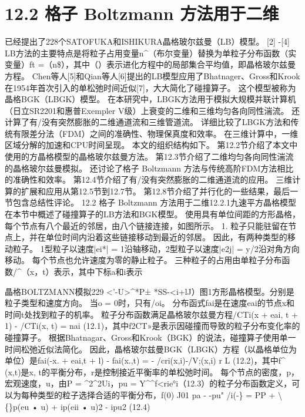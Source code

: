 \documentclass[UTF8,11pt,a4paper,openany,fontset=fandol]{ctexbook}
\begin{document}
\section{12.2 格子 Boltzmann 方法用于二维}
已经提出了228个SATOFUKA和ISHIKURA晶格玻尔兹曼（LB）模型。 [2] -[4] LB方法的主要特点是将粒子占用变量n\textasciicircum{}（布尔变量）替换为单粒子分布函数（实变量）ft =（n\$），其中（）表示进化方程中的局部集合平均值，即晶格玻尔兹曼方程。 Chen等人[5]和Qian等人[6]提出的LB模型应用了Bhatnager、Gross和Krook在1954年首次引入的单松弛时间近似[7]，大大简化了碰撞算子。 这个模型被称为晶格BGK（LBGK）模型。 在本研究中，LBGK方法用于模拟大规模并联计算机（日立SR2201和惠普Exempler V级）上衰变的二维和三维均匀各向同性湍流。 还计算了有/没有突然膨胀的二维通道流和三维管道流。 详细比较了LBGK方法和传统有限差分法（FDM）之间的准确性、物理保真度和效率。 在三维计算中，一维区域分解的加速和CPU时间呈现。 本文的组织结构如下。 第12.2节介绍了本文中使用的方晶格模型的晶格玻尔兹曼方法。 第12.3节介绍了二维均匀各向同性湍流的晶格玻尔兹曼模拟。 还讨论了格子 Boltzmann 方法与传统高阶FDM方法相比的准确性和效率。 第12.4节介绍了有/没有突然膨胀的二维通道流的应用。 三维计算的扩展和应用从第12.5节到12.7节。 第12.8节介绍了并行化的一些结果，最后一节包含总结性评论。 12.2 格子 Boltzmann 方法用于二维12.2.1九速平方晶格模型在本节中概述了碰撞算子的LB方法和BGK模型。 使用具有单位间距的方形晶格，每个节点有八个最近的邻居，由八个链接连接，如图所示。 1. 粒子只能驻留在节点上，并在单位时间内沿着这些链接移动到最近的邻居。 因此，有两种类型的移动粒子。 1型粒子以速度|ei*| = 1沿轴移动，2型粒子以速度|e2j| = y/2沿对角方向移动。 每个节点也允许速度为零的静止粒子。 三种粒子的占用由单粒子分布函数/\textasciicircum{}（x，t）表示，其中下标a和i表示

晶格BOLTZMANN模拟229 <'-U>\textasciicircum{}*P± *SS-<i+lJ）图1方形晶格模型。分别是粒子类型和速度方向。 当o = 0时，只有/oi。 分布函式fai是在速度eai的节点x和时间t处找到粒子的机率。 粒子分布函数满足晶格玻尔兹曼方程/CTi(x + eai, t + 1) - /CTi(x, t) = nai (12.1)，其中f2CT»是表示因碰撞而导致的粒子分布变化率的碰撞算子。 根据Bhatnagar、Gross和Krook（BGK）的说法，碰撞算子使用单一时间松弛近似法简化。 因此，晶格玻尔兹曼BGK（LBGK）方程（以晶格单位为单位）是fai(-x. + eai,t + l) - fai(x.,t) = - /cri(x,i)-/V;(x,i) r L (12.2)，其中f\textasciicircum{} (x,t)是x, t的平衡分布，r是控制接近平衡率的单松弛时间。 每个节点的密度，p，宏观速度，u，由P = \textasciicircum{}2\textasciicircum{}2Ui，pu = Y\textasciicircum{}\textasciicircum{}f<rie°i（12.3）的粒子分布函数定义，可以为每种类型的粒子选择合适的平衡分布，f(0) J01 pa - -pu" /i(-\} = PP + \textbackslash\{\}p(eu • u) + ip(eii • u)2 - ipu2 (12.4)
\end{document}

